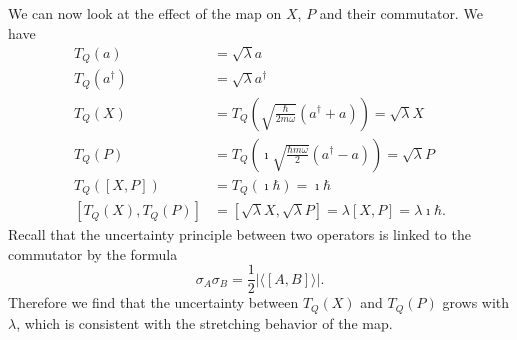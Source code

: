 \documentclass{article}
\begin{document}
We can now look at the effect of the map on $X$, $P$ and their commutator. We have
\begin{align}
    T_Q(a) &= \sqrt{\lambda} a \\ 
    T_Q(a^\dagger) &= \sqrt{\lambda} a^\dagger \\ 
    T_Q(X) &= T_Q\left(\sqrt{\frac{\hbar}{2m\omega}}(a^\dagger + a)\right) = \sqrt{\lambda} X \\
    T_Q(P) &= T_Q\left(\imath\sqrt{\frac{\hbar m \omega}{2}}(a^\dagger - a)\right) = \sqrt{\lambda} P \\
    T_Q([X, P]) &= T_Q(\imath \hbar) = \imath \hbar \\
    [T_Q(X), T_Q(P)] &= [ \sqrt{\lambda} X, \sqrt{\lambda} P] = \lambda [X, P] = \lambda \imath \hbar.
\end{align}
Recall that the uncertainty principle between two operators is linked to the commutator by the formula
\begin{equation}
    \sigma_A \sigma_B = \frac{1}{2} | \langle [A,B] \rangle |.
\end{equation}
Therefore we find that the uncertainty between $T_Q(X)$ and $T_Q(P)$ grows with $\lambda$, which is consistent with the stretching behavior of the map.
\end{document}
